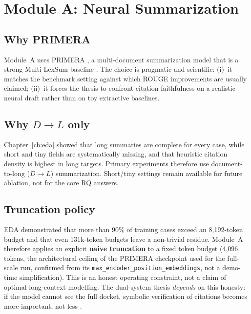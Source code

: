 \section{Module A: Neural Summarization}
\label{sec:module-a}

\subsection{Why PRIMERA}
Module~A uses PRIMERA \cite{xiao2022primera}, a multi-document summarization model that is a strong Multi-LexSum baseline \cite{shen2022multilexsum}. The choice is pragmatic and scientific: (i)~it matches the benchmark setting against which ROUGE improvements are usually claimed; (ii)~it forces the thesis to confront citation faithfulness on a realistic neural draft rather than on toy extractive baselines.

\subsection{Why $D\rightarrow L$ only}
Chapter~\ref{ch:eda} showed that long summaries are complete for every case, while short and tiny fields are systematically missing, and that heuristic citation density is highest in long targets. Primary experiments therefore use document-to-long ($D\rightarrow L$) summarization. Short/tiny settings remain available for future ablation, not for the core RQ answers.

\subsection{Truncation policy}
EDA demonstrated that more than 90\% of training cases exceed an 8{,}192-token budget and that even 131k-token budgets leave a non-trivial residue. Module~A therefore applies an explicit \textbf{naive truncation} to a fixed token budget (4{,}096 tokens, the architectural ceiling of the PRIMERA checkpoint used for the full-scale run, confirmed from its \texttt{max\_encoder\_position\_embeddings}, not a demo-time simplification). This is an honest operating constraint, not a claim of optimal long-context modelling. The dual-system thesis \emph{depends} on this honesty: if the model cannot see the full docket, symbolic verification of citations becomes more important, not less \cite{maynez2020faithfulness,beltagy2020longformer}.

